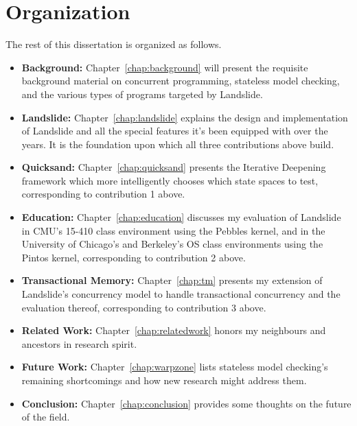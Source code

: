 \section{Organization}

The rest of this dissertation is organized as follows.

\begin{itemize}
	\item {\bf Background:} Chapter~\ref{chap:background} will present the requisite background material on concurrent programming, stateless model checking, and the various types of programs targeted by Landslide.
	\item {\bf Landslide:} Chapter~\ref{chap:landslide} explains the design and implementation of Landslide
		and all the special features it's been equipped with over the years.
		It is the foundation upon which all three contributions above build.
	\item {\bf Quicksand:} Chapter~\ref{chap:quicksand} presents the Iterative Deepening framework which more intelligently chooses which state spaces to test, corresponding to contribution 1 above.
	\item {\bf Education:} Chapter~\ref{chap:education} discusses my evaluation of Landslide
		in CMU's 15-410 class environment using the Pebbles kernel,
		and in the University of Chicago's and Berkeley's OS class environments using the Pintos kernel,
		corresponding to contribution 2 above.
	\item {\bf Transactional Memory:} Chapter~\ref{chap:tm} presents my extension of Landslide's concurrency model to handle transactional concurrency and the evaluation thereof, corresponding to contribution 3 above.
	\item {\bf Related Work:} Chapter~\ref{chap:relatedwork} honors my neighbours and ancestors in research spirit.
	\item {\bf Future Work:} Chapter~\ref{chap:warpzone} lists stateless model checking's remaining shortcomings and how new research might address them.
	\item {\bf Conclusion:} Chapter~\ref{chap:conclusion} provides some thoughts on the future of the field.
\end{itemize}

